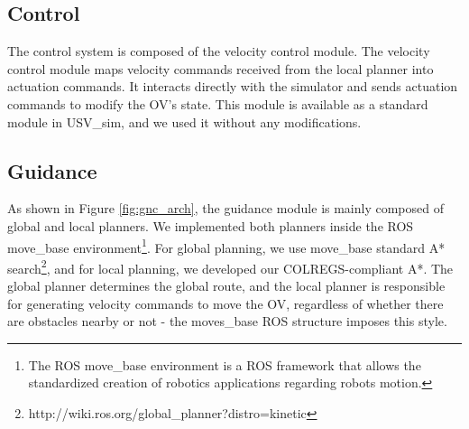     \subsection{Control}
    \label{sec:chap4_control}
    
        The control system is composed of the velocity control module. The velocity control module maps velocity commands received from the local planner into actuation commands. It interacts directly with the simulator and sends actuation commands to modify the \ac{OV}'s state.  This module is available as a standard module in USV\_sim, and we used it without any modifications.
        
    \subsection{Guidance}
    \label{sec:chap4_guidance}

        As shown in Figure \ref{fig:gnc_arch}, the guidance module is mainly composed of global and local planners. We implemented both planners inside the ROS move\_base environment\footnote{The ROS move\_base environment is a ROS framework that allows the standardized creation of robotics applications regarding robots motion.}. For global planning, we use move\_base standard A* search\footnote{http://wiki.ros.org/global\_planner?distro=kinetic}, and for local planning, we developed our \ac{COLREGS}-compliant A*. The global planner determines the global route, and the local planner is responsible for generating velocity commands to move the \ac{OV}, regardless of whether there are obstacles nearby or not - the moves\_base ROS structure imposes this style.
        
